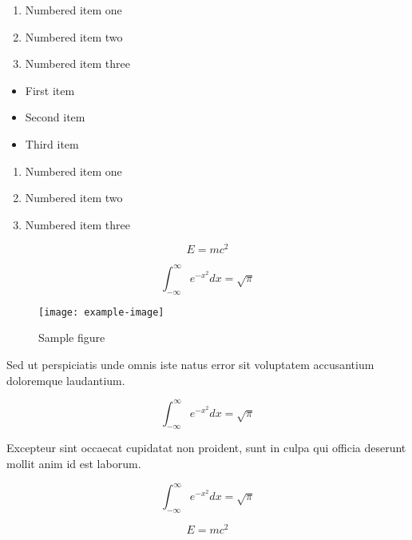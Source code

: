 \documentclass{article}
\begin{document}
\begin{enumerate}
\item Numbered item one
\item Numbered item two
\item Numbered item three
\end{enumerate}

\begin{itemize}
\item First item
\item Second item
\item Third item
\end{itemize}

\begin{enumerate}
\item Numbered item one
\item Numbered item two
\item Numbered item three
\end{enumerate}


\begin{equation}
    E = mc^2
\end{equation}

\begin{equation}
    \int_{-\infty}^{\infty} e^{-x^2} dx = \sqrt{\pi}
\end{equation}

\begin{figure}[h]
    \centering
    \texttt{[image: example-image]}
    \caption{Sample figure}
    \label{fig:sample}
\end{figure}

Sed ut perspiciatis unde omnis iste natus error sit voluptatem accusantium doloremque laudantium.


\begin{equation}
    \int_{-\infty}^{\infty} e^{-x^2} dx = \sqrt{\pi}
\end{equation}

Excepteur sint occaecat cupidatat non proident, sunt in culpa qui officia deserunt mollit anim id est laborum.

\begin{equation}
    \int_{-\infty}^{\infty} e^{-x^2} dx = \sqrt{\pi}
\end{equation}

\begin{equation}
    E = mc^2
\end{equation}
\end{document}
